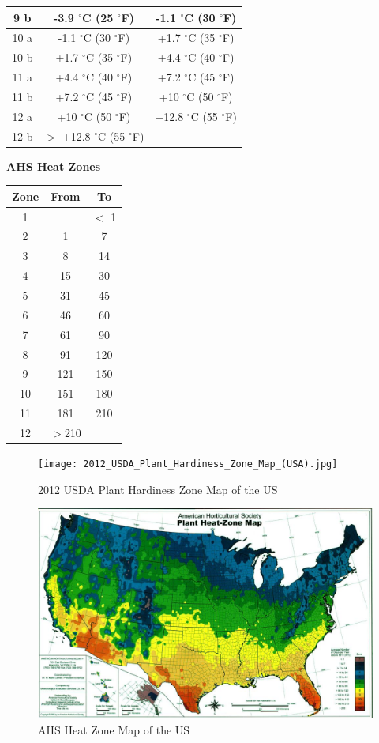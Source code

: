 \documentclass[10pt]{extarticle}
\begin{document}
\begin{center}
\begin{tabular}{|c|c|c|}
\hline 
9 b &	-3.9 $^{\circ}$C (25 $^{\circ}$F) &	-1.1 $^{\circ}$C (30 $^{\circ}$F)
\\
\hline 
10 a &	-1.1 $^{\circ}$C (30 $^{\circ}$F) &	+1.7 $^{\circ}$C (35 $^{\circ}$F)
\\
\hline 
10 b &	+1.7 $^{\circ}$C (35 $^{\circ}$F) &	+4.4 $^{\circ}$C (40 $^{\circ}$F)
\\
\hline 
11 a &	+4.4 $^{\circ}$C (40 $^{\circ}$F) &	+7.2 $^{\circ}$C (45 $^{\circ}$F)
\\
\hline 
11 b &	+7.2 $^{\circ}$C (45 $^{\circ}$F) &	+10 $^{\circ}$C (50 $^{\circ}$F)
\\
\hline 
12 a &	+10 $^{\circ}$C (50 $^{\circ}$F) & +12.8 $^{\circ}$C (55 $^{\circ}$F)
\\
\hline 
12 b &  $>$ +12.8 $^{\circ}$C (55 $^{\circ}$F)  & \\
\hline 
\end{tabular}
\end{center}
\begin{center}
\textbf{AHS Heat Zones} \\
\begin{tabular}{|c|c|c|}
	\hline
	Zone &	From &	To
\\
	\hline
	1 && $<$ 1
\\
	\hline
	2 &	1 &	7
\\
	\hline
	3 &	8 &	14
\\
	\hline
	4 &	15 & 30
\\
	\hline
	5 &	31 & 45
\\
	\hline
	6 &	46 & 60
\\
	\hline
	7 &	61 & 90
\\
	\hline
	8 &	91 & 120
\\
	\hline
	9 &	121 & 150 \\
	\hline
	10 & 151 & 180
\\
	\hline
	11 & 181 & 210
\\
	\hline
	12 & $>$210 & \\
	\hline
\end{tabular}
\end{center}

\begin{figure}
	\texttt{[image: 2012\_USDA\_Plant\_Hardiness\_Zone\_Map\_(USA).jpg]}
	\caption{2012 USDA Plant Hardiness Zone Map of the US}
	\label{fig:PlantHardinessZoneMapoftheUS}
\end{figure}

\begin{figure}
	\includegraphics[width=\linewidth]{Heat_Zone_Map_USA.jpg}
	\caption{AHS Heat Zone Map of the US}
	\label{fig:AHS Heat Zone Map}
\end{figure}
\end{document}
